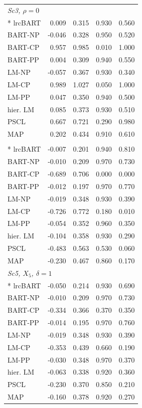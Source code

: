 \begin{longtable}{lrrrr}
\multicolumn{5}{l}{\strut\textit{Sc3, $\rho=0$}}\\*
lrcBART & 0.009 & 0.315 & 0.930 & 0.560 \\
BART-NP & -0.046 & 0.328 & 0.950 & 0.520 \\
BART-CP & 0.957 & 0.985 & 0.010 & 1.000 \\
BART-PP & 0.004 & 0.309 & 0.940 & 0.550 \\
LM-NP & -0.057 & 0.367 & 0.930 & 0.340 \\
LM-CP & 0.989 & 1.027 & 0.050 & 1.000 \\
LM-PP & 0.047 & 0.350 & 0.940 & 0.500 \\
hier. LM & 0.085 & 0.373 & 0.930 & 0.510 \\
PSCL & 0.667 & 0.721 & 0.290 & 0.980 \\
MAP & 0.202 & 0.434 & 0.910 & 0.610 \\
\newpage
\multicolumn{5}{l}{\strut\textit{Sc4, $\delta=1$}}\\*
lrcBART & -0.007 & 0.201 & 0.940 & 0.810 \\
BART-NP & -0.010 & 0.209 & 0.970 & 0.730 \\
BART-CP & -0.689 & 0.706 & 0.000 & 0.000 \\
BART-PP & -0.012 & 0.197 & 0.970 & 0.770 \\
LM-NP & -0.019 & 0.348 & 0.930 & 0.390 \\
LM-CP & -0.726 & 0.772 & 0.180 & 0.010 \\
LM-PP & -0.054 & 0.352 & 0.960 & 0.350 \\
hier. LM & -0.104 & 0.358 & 0.930 & 0.290 \\
PSCL & -0.483 & 0.563 & 0.530 & 0.060 \\
MAP & -0.230 & 0.467 & 0.860 & 0.170 \\
\multicolumn{5}{l}{\strut\textit{Sc5, $X_5$, $\delta=1$}}\\*
lrcBART & -0.050 & 0.214 & 0.930 & 0.690 \\
BART-NP & -0.010 & 0.209 & 0.970 & 0.730 \\
BART-CP & -0.334 & 0.366 & 0.370 & 0.350 \\
BART-PP & -0.014 & 0.195 & 0.970 & 0.760 \\
LM-NP & -0.019 & 0.348 & 0.930 & 0.390 \\
LM-CP & -0.353 & 0.439 & 0.660 & 0.190 \\
LM-PP & -0.030 & 0.348 & 0.970 & 0.370 \\
hier. LM & -0.063 & 0.338 & 0.920 & 0.360 \\
PSCL & -0.230 & 0.370 & 0.850 & 0.210 \\
MAP & -0.160 & 0.378 & 0.920 & 0.270 \\
\end{longtable}
